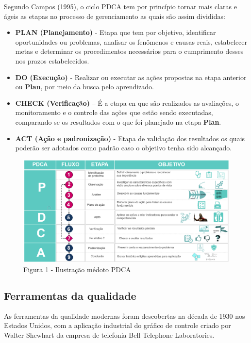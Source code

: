 \documentclass[
]{article}
\begin{document}
Segundo Campos (1995), o ciclo PDCA tem por princípio tornar mais claras e ágeis as etapas no processo de gerenciamento as quais são assim divididas:

\begin{itemize}
\item
  \textbf{PLAN (Planejamento)} - Etapa que tem por objetivo, identificar oportunidades ou problemas, analisar os fenômenos e causas reais, estabelecer metas e determinar os procedimentos necessários para o cumprimento desses nos prazos estabelecidos.
\item
  \textbf{DO (Execução)} - Realizar ou executar as ações propostas na etapa anterior ou \textbf{Plan}, por meio da busca pelo aprendizado.
\item
  \textbf{CHECK (Verificação)} -- É a etapa en que são realizados as avaliações, o monitoramento e o controle das ações que estão sendo executadas, comparando-se os resultados com o que foi planejado na etapa \textbf{Plan}.
\item
  \textbf{ACT (Ação e padronização)} - Etapa de validação dos resultados os quais poderão ser adotados como padrão caso o objetivo tenha sido alcançado.
\end{itemize}

\begin{figure}
\centering
\includegraphics{images/pdca_chart.png}
\caption{Figura 1 - Ilustração médoto PDCA}
\end{figure}

\hypertarget{ferramentas-da-qualidade}{%
\subsection{Ferramentas da qualidade}\label{ferramentas-da-qualidade}}

As ferramentas da qualidade modernas foram descobertas na década de 1930 nos Estados Unidos, com a aplicação industrial do gráfico de controle criado por Walter Shewhart da empresa de telefonia Bell Telephone Laboratories.
\end{document}
